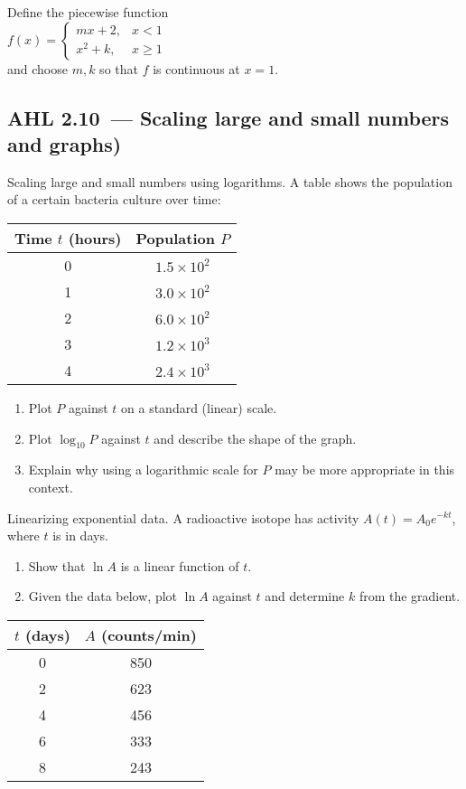 \documentclass[11pt]{article}
\def\textbf#1{#1}%
\newcommand{\tocsubsection}[1]{\subsection{#1}}
\newcounter{question}
\begin{document}
\begin{question}
Define the piecewise function
\\[0.5em]
\(f(x)=\begin{cases}mx+2,&x<1\\ x^2+k,&x\ge1\end{cases}\)
\\[0.5em]
and choose $m,k$ so that $f$ is continuous at $x=1$.
\end{question}


\tocsubsection{AHL 2.10 — Scaling large and small numbers and graphs)}


\begin{question}
\textbf{Scaling large and small numbers using logarithms.}
A table shows the population of a certain bacteria culture over time:

\begin{center}
\begin{tabular}{c|c}
Time $t$ (hours) & Population $P$ \\
\hline
0 & $1.5\times 10^{2}$ \\
1 & $3.0\times 10^{2}$ \\
2 & $6.0\times 10^{2}$ \\
3 & $1.2\times 10^{3}$ \\
4 & $2.4\times 10^{3}$
\end{tabular}
\end{center}

\begin{enumerate}
    \item Plot $P$ against $t$ on a standard (linear) scale.
    \item Plot $\log_{10}P$ against $t$ and describe the shape of the graph.
    \item Explain why using a logarithmic scale for $P$ may be more appropriate in this context.
\end{enumerate}
\end{question}

\begin{question}
\textbf{Linearizing exponential data.}
A radioactive isotope has activity $A(t)=A_0 e^{-kt}$, where $t$ is in days.
\begin{enumerate}
    \item Show that $\ln A$ is a linear function of $t$.
    \item Given the data below, plot $\ln A$ against $t$ and determine $k$ from the gradient.
\end{enumerate}

\begin{center}
\begin{tabular}{c|c}
$t$ (days) & $A$ (counts/min) \\
\hline
0 & 850 \\
2 & 623 \\
4 & 456 \\
6 & 333 \\
8 & 243
\end{tabular}
\end{center}
\end{question}
\end{document}
